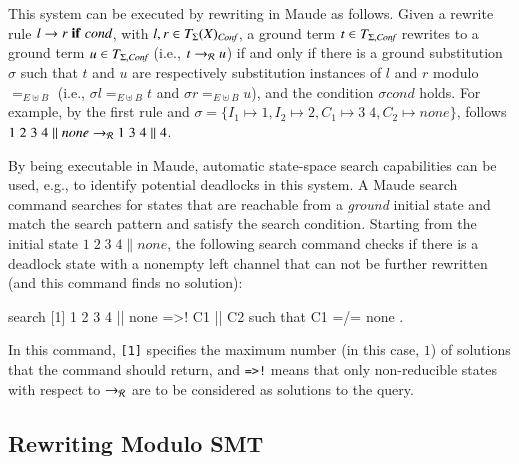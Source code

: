 This system can be executed by rewriting in Maude as follows. Given a
rewrite rule $l \rightarrow r \; \mathbf{if}\; \textit{cond}$, with $l,r \in
T_\Sigma(X)_{\textit{Conf}}$, %
a
ground term $t \in T_{\Sigma,\textit{Conf}}$ rewrites to a ground term
$u \in T_{\Sigma,\textit{Conf}}$ (i.e., $t \rightarrow_{\mathcal{R}} u$) 
if and only if there is a ground substitution $\sigma$ 
such that $t$ and $u$ are respectively substitution instances of $l$ and $r$
modulo $=_{E\uplus B}$ (i.e.,  $\sigma l =_{E \uplus B} t$ and $\sigma r =_{E \uplus B} u$), 
and the condition $\sigma \textit{cond}$ holds.
For example, 
by the first rule
and %
$\sigma = \{I_1 \mapsto 1, I_2 \mapsto 2, C_1\mapsto 3\;4, C_2 \mapsto \textit{none}\}$,
follows $1\;2\;3\;4 \parallel \textit{none} \rightarrow_{\mathcal{R}} 1\;3\;4 \parallel 4$.

By being executable in Maude, automatic state-space search
capabilities can be used, e.g., to identify potential deadlocks in
this system.  A Maude search command searches for states that are reachable
from a \emph{ground} initial state 
and match the search pattern and satisfy the search condition.
Starting from the initial state $1\;2\;3\;4
\parallel \textit{none}$, the following search command checks if there
is a deadlock state with a nonempty left channel that can not be further rewritten (and this command finds no solution):
%
\begin{maude}
search [1]   1 2 3 4 || none   =>!   C1 || C2   such that C1 =/= none .
\end{maude}
%
In this command, %
\verb|[1]| %
specifies the maximum
number (in this case, $1$) of solutions that the command should return,
and \verb|=>!| means 
that only non-reducible states with respect to $\rightarrow_{\mathcal{R}}$ are to be considered as
solutions to the query. 



\subsection{Rewriting Modulo SMT}
\label{sec:rw-smt}

